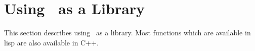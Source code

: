 \section{Using \lips\ as a Library}

This section describes using \lips\ as a library. Most functions which
are available in lisp are also available in \textsf{C++}.

